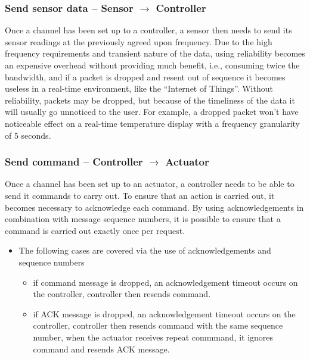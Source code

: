 \subsubsection{Send sensor data -- Sensor $\rightarrow$ Controller} %
\label{ssub:send_sensor_data}
Once a channel has been set up to a controller, a sensor then needs to send its sensor readings at the previously agreed upon frequency. 
Due to the high frequency requirements and transient nature of the data, using reliability becomes an expensive overhead without providing much benefit, i.e., consuming twice the bandwidth, and if a packet is dropped and resent out of sequence it becomes useless in a real-time environment, like the ``Internet of Things''.  
Without reliability, packets may be dropped, but because of the timeliness of the data it will usually go unnoticed to the user. For example, a dropped packet won't have noticeable effect on a real-time temperature display with a frequency granularity of 5 seconds.

\subsubsection{Send command -- Controller $\rightarrow$ Actuator} %
\label{ssub:send_command}
Once a channel has been set up to an actuator, a controller needs to be able to send it commands to carry out. To ensure that an action is carried out, it becomes necessary to acknowledge each command. By using acknowledgements in combination with message sequence numbers, it is possible to ensure that a command is carried out exactly once per request.
\vspace{-5mm} 
\begin{itemize}
	\item The following cases are covered via the use of acknowledgements and sequence numbers
	\begin{itemize}
		\item if command message is dropped, an acknowledgement timeout occurs on the controller, controller then resends command.
		\item if ACK message is dropped, an acknowledgement timeout occurs on the controller, controller then resends command with the same sequence number, when the actuator receives repeat commmand, it ignores command and resends ACK message.
	\end{itemize}
\end{itemize}


